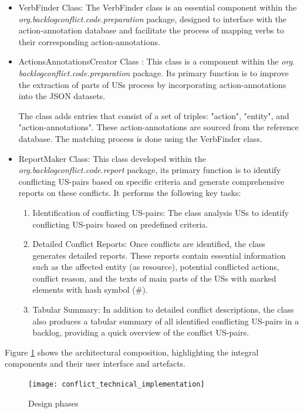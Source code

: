 \begin{itemize}
	\item VerbFinder Class: The VerbFinder class is an essential component within the \textit{org.backlogconflict.code.preparation} package, designed to interface with the action-annotation database and facilitate the process of mapping verbs to their corresponding action-annotations. 
	
	\item ActionsAnnotationsCreator Class : This class is a component within the \textit{org. backlogconflict.code.preparation} package. Its primary function is to improve the extraction of parts of USs process by incorporating action-annotations into the JSON datasets. 
	
	The class adds entries that consist of a set of triples: "action", "entity", and "action-annotations". These action-annotations are sourced from the reference database. The matching process is done using the VerbFinder class. 
	
	\item ReportMaker Class: This class developed within the \textit{org.backlogconflict.code.report} package, its primary function is to identify conflicting US-pairs based on specific criteria and generate comprehensive reports on these conflicts. It performs the following key tasks:%
	\begin{enumerate}
		\item Identification of conflicting US-pairs: The class analysis USs to identify conflicting US-pairs based on predefined criteria.
		
		\item Detailed Conflict Reports: Once conflicts are identified, the class generates detailed reports. These reports contain essential information such as the affected entity (as resource), potential conflicted actions, conflict reason, and the texts of main parts of the USs with marked elements with hash symbol (\#).
		
		\item Tabular Summary: In addition to detailed conflict descriptions, the class also produces a tabular summary of all identified conflicting US-pairs in a backlog, providing a quick overview of the conflict US-pairs.
	\end{enumerate}

	
\end{itemize}
Figure \ref{fig:conflict_technical_implementation} shows the architectural composition, highlighting the integral components and their user interface and artefacts.
\begin{figure}[h]
	\centering 
	\texttt{[image: conflict\_technical\_implementation]}
	\caption{Design phases}\label{fig:conflict_technical_implementation}
\end{figure}


